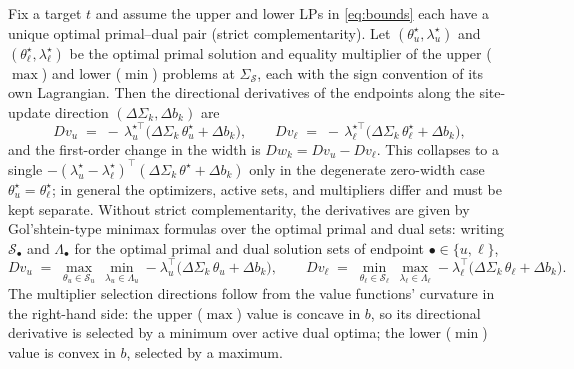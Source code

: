 \begin{proposition}
\label{prop:envelope}
Fix a target $t$ and assume the upper and lower LPs in \eqref{eq:bounds} each
have a unique optimal primal--dual pair (strict complementarity). Let
$(\theta_u^\star,\lambda_u^\star)$ and $(\theta_\ell^\star,\lambda_\ell^\star)$
be the optimal primal solution and equality multiplier of the upper ($\max$) and
lower ($\min$) problems at $\Sigma_\mathcal{S}$, each with the sign convention of
its own Lagrangian. Then the directional derivatives of the endpoints along the
site-update direction $(\Delta\Sigma_k,\Delta b_k)$ are
\begin{equation}
\label{eq:envelope}
D v_u \;=\; -\,\lambda_u^{\star\top}\bigl(\Delta\Sigma_k\,\theta_u^\star+\Delta b_k\bigr),
\qquad
D v_\ell \;=\; -\,\lambda_\ell^{\star\top}\bigl(\Delta\Sigma_k\,\theta_\ell^\star+\Delta b_k\bigr),
\end{equation}
and the first-order change in the width is $D w_k = D v_u-D v_\ell$. This
collapses to a single $-(\lambda_u^\star-\lambda_\ell^\star)^\top
(\Delta\Sigma_k\,\theta^\star+\Delta b_k)$ only in the degenerate zero-width case
$\theta_u^\star=\theta_\ell^\star$; in general the optimizers, active sets, and
multipliers differ and must be kept separate. Without strict complementarity,
the derivatives are given by Gol'shtein-type minimax formulas over the optimal
primal and dual sets: writing $\mathcal{S}_\bullet$ and $\Lambda_\bullet$ for
the optimal primal and dual solution sets of endpoint $\bullet\in\{u,\ell\}$,
\[
D v_u \;=\; \max_{\theta_u\in\mathcal{S}_u}\,\min_{\lambda_u\in\Lambda_u}
 -\lambda_u^{\top}\bigl(\Delta\Sigma_k\,\theta_u+\Delta b_k\bigr),
\qquad
D v_\ell \;=\; \min_{\theta_\ell\in\mathcal{S}_\ell}\,\max_{\lambda_\ell\in\Lambda_\ell}
 -\lambda_\ell^{\top}\bigl(\Delta\Sigma_k\,\theta_\ell+\Delta b_k\bigr).
\]
The multiplier selection directions follow from the value functions' curvature
in the right-hand side: the upper ($\max$) value is concave in $b$, so its
directional derivative is selected by a minimum over active dual optima;
the lower ($\min$) value is convex in $b$, selected by a maximum.
\end{proposition}

